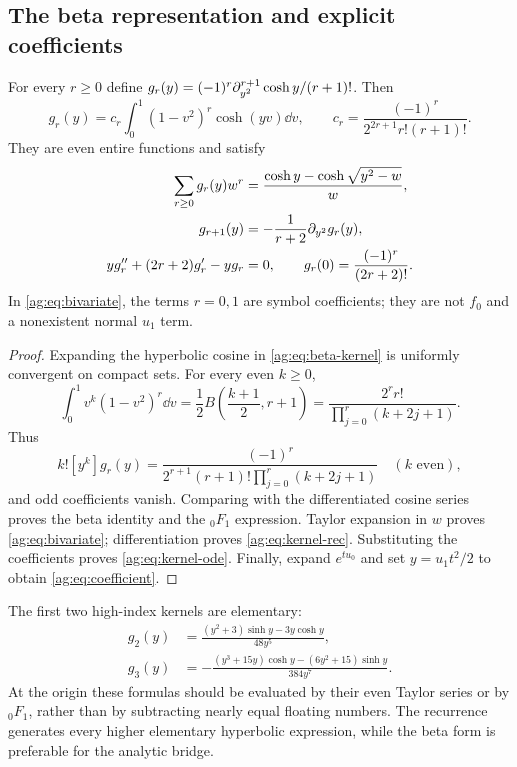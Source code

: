 \subsection{The beta representation and explicit coefficients}
\begin{proposition}\label{ag:prop:kernel}
For every $r\ge0$ define
$g_r(y)=(-1)^r\partial_{y^2}^{r+1}\cosh y/(r+1)!$. Then
\begin{equation}\label{ag:eq:beta-kernel}
 g_r(y)=c_r\int_0^1(1-v^2)^r\cosh(yv)\dd v,
 \qquad c_r=\frac{(-1)^r}{2^{2r+1}r!(r+1)!}.
\end{equation}
They are even entire functions and satisfy
\begin{align}
 \sum_{r\ge0}g_r(y)w^r
   &=\frac{\cosh y-\cosh\sqrt{y^2-w}}{w},
       \label{ag:eq:bivariate}\\
 g_{r+1}(y)&=-\frac1{r+2}\partial_{y^2} g_r(y),
       \label{ag:eq:kernel-rec}\\
 yg_r''+(2r+2)g_r'-yg_r&=0,
 \qquad g_r(0)=\frac{(-1)^r}{(2r+2)!}.
       \label{ag:eq:kernel-ode}
\end{align}
In \eqref{ag:eq:bivariate}, the terms $r=0,1$ are symbol coefficients;
they are not $f_0$ and a nonexistent normal $u_1$ term.
\end{proposition}
\begin{proof}
Expanding the hyperbolic cosine in \eqref{ag:eq:beta-kernel} is uniformly
convergent on compact sets. For every even $k\ge0$,
\[
 \int_0^1v^k(1-v^2)^r\dd v
 =\frac12 B\left(\frac{k+1}{2},r+1\right)
 =\frac{2^r r!}{\prod_{j=0}^r(k+2j+1)}.
\]
Thus
\begin{equation}\label{ag:eq:kernel-coeff}
 k![y^k]g_r(y)=
 \frac{(-1)^r}{2^{r+1}(r+1)!\prod_{j=0}^r(k+2j+1)}
 \quad(k\text{ even}),
\end{equation}
and odd coefficients vanish. Comparing with the differentiated cosine
series proves the beta identity and the ${}_0F_1$ expression.
Taylor expansion in $w$ proves \eqref{ag:eq:bivariate}; differentiation
proves \eqref{ag:eq:kernel-rec}. Substituting the coefficients proves
\eqref{ag:eq:kernel-ode}. Finally, expand $e^{tu_0}$ and set
$y=u_1t^2/2$ to obtain \eqref{ag:eq:coefficient}.
\end{proof}

The first two high-index kernels are elementary:
\begin{align}
 g_2(y)&=\frac{(y^2+3)\sinh y-3y\cosh y}{48y^5},
       \label{ag:eq:g2}\\
 g_3(y)&=-\frac{(y^3+15y)\cosh y-(6y^2+15)\sinh y}{384y^7}.
       \label{ag:eq:g3}
\end{align}
At the origin these formulas should be evaluated by their even Taylor
series or by ${}_0F_1$, rather than by subtracting nearly equal floating
numbers. The recurrence generates every higher elementary hyperbolic
expression, while the beta form is preferable for the analytic bridge.
